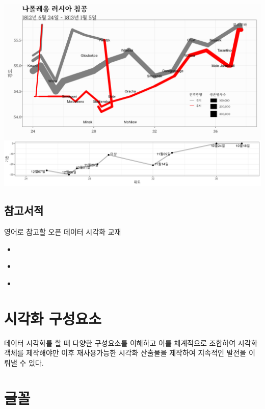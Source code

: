 \documentclass[
]{book}
\providecommand{\tightlist}{%
  \setlength{\itemsep}{0pt}\setlength{\parskip}{0pt}}
\begin{document}
\includegraphics[width=1\textwidth,height=\textheight]{assets/images/나폴레옹_러시아.png}

\hypertarget{references}{%
\section{참고서적}\label{references}}

영어로 참고할 오픈 데이터 시각화 교재

\begin{itemize}
\tightlist
\item
  \citep{healy2018data}
\item
  \citep{dougherty2021hands}
\item
  \citep{wilke2019fundamentals}
\end{itemize}

\hypertarget{uxc2dcuxac01uxd654-uxad6cuxc131uxc694uxc18c}{%
\chapter*{시각화 구성요소}\label{uxc2dcuxac01uxd654-uxad6cuxc131uxc694uxc18c}}

데이터 시각화를 할 때 다양한 구성요소를 이해하고 이를 체계적으로 조합하여
시각화 객체를 제작해야만 이후 재사용가능한 시각화 산출물을 제작하여 지속적인
발전을 이뤄낼 수 있다.

\hypertarget{viz-font}{%
\chapter{글꼴}\label{viz-font}}
\end{document}
